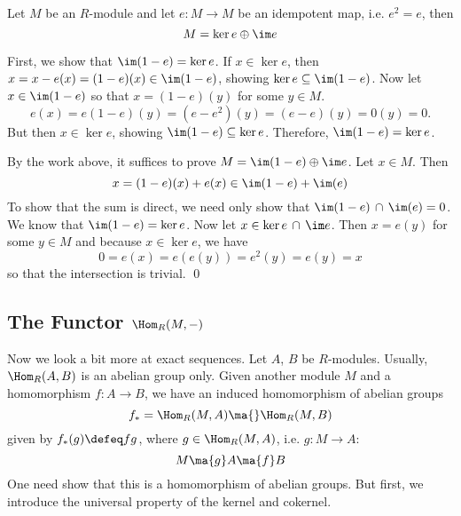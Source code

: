 \begin{lem}
Let $M$ be an $R$-module and let $e: M \rightarrow M$ be an idempotent map, i.e. $e^2=e$, then
	\[
	M=\ker e \oplus \im e
	\]
\end{lem}

\pf First, we show that $\im (1-e)=\ker e$. If $x \in \ker e$, then $x=x-e(x)=(1-e)(x) \in \im(1-e)$, showing $\ker e \subseteq \im (1-e)$. Now let $x \in \im(1-e)$ so that $x=(1-e)(y)$ for some $y \in M$. 
	\[
	e(x)=e(1-e)(y)=(e-e^2)(y)=(e-e)(y)=0(y)=0.
	\]
But then $x \in \ker e$, showing $\im(1-e) \subseteq \ker e$. Therefore, $\im(1-e)=\ker e$. 

By the work above, it suffices to prove $M=\im(1-e) \oplus \im e$. Let $x \in M$. Then
	\[
	x=(1-e)(x)+e(x) \in \im(1-e)+\im(e)
	\]
To show that the sum is direct, we need only show that $\im(1-e) \,\cap\, \im(e)=0$. We know that $\im(1-e)=\ker e$. Now let $x \in \ker e \,\cap\, \im e$. Then $x=e(y)$ for some $y \in M$ and because $x \in \ker e$, we have
	\[
	0=e(x)=e(e(y))=e^2(y)=e(y)=x
	\]
so that the intersection is trivial. \qed \\



\subsection{The Functor $\Hom_R(M,-)$}


Now we look a bit more at exact sequences. Let $A$, $B$ be $R$-modules. Usually, $\Hom_R(A,B)$ is an abelian group only. Given another module $M$ and a homomorphism $f: A \to B$, we have an induced homomorphism of abelian groups
	\[
	f_*= \Hom_R(M,A) \ma{} \Hom_R(M,B) 
	\]
given by $f_*(g)\defeq fg$, where $g \in \Hom_R(M,A)$, i.e. $g: M \to A$:
	\[
	M \ma{g} A \ma{f} B
	\]
One need show that this is a homomorphism of abelian groups. But first, we introduce the universal property of the kernel and cokernel. 


